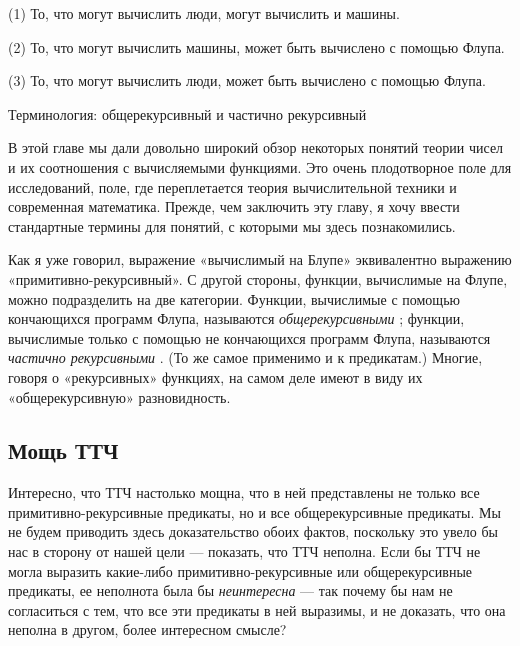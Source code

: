 \documentclass[../main.tex]{subfiles}
\begin{document}
(1) То, что могут вычислить люди, могут вычислить и машины.

(2) То, что могут вычислить машины, может быть вычислено с помощью Флупа.

(3) То, что могут вычислить люди, может быть вычислено с помощью Флупа.

Терминология: общерекурсивный и частично рекурсивный

В этой главе мы дали довольно широкий обзор некоторых понятий теории чисел и их соотношения с вычисляемыми функциями. Это очень плодотворное поле для исследований, поле, где переплетается теория вычислительной техники и современная математика. Прежде, чем заключить эту главу, я хочу ввести стандартные термины для понятий, с которыми мы здесь познакомились.

Как я уже говорил, выражение «вычислимый на Блупе» эквивалентно выражению «примитивно-рекурсивный». С другой стороны, функции, вычислимые на Флупе, можно подразделить на две категории. Функции, вычислимые с помощью кончающихся программ Флупа, называются \emph{общерекурсивными} ; функции, вычислимые только с помощью не кончающихся программ Флупа, называются \emph{частично рекурсивными} . (То же самое применимо и к предикатам.) Многие, говоря о «рекурсивных» функциях, на самом деле имеют в виду их «общерекурсивную» разновидность.


\subsection{Мощь ТТЧ}

Интересно, что ТТЧ настолько мощна, что в ней представлены не только все примитивно-рекурсивные предикаты, но и все общерекурсивные предикаты. Мы не будем приводить здесь доказательство обоих фактов, поскольку это увело бы нас в сторону от нашей цели --- показать, что ТТЧ неполна. Если бы ТТЧ не могла выразить какие-либо примитивно-рекурсивные или общерекурсивные предикаты, ее неполнота была бы \emph{неинтересна} --- так почему бы нам не согласиться с тем, что все эти предикаты в ней выразимы, и не доказать, что она неполна в другом, более интересном смысле?
\end{document}
